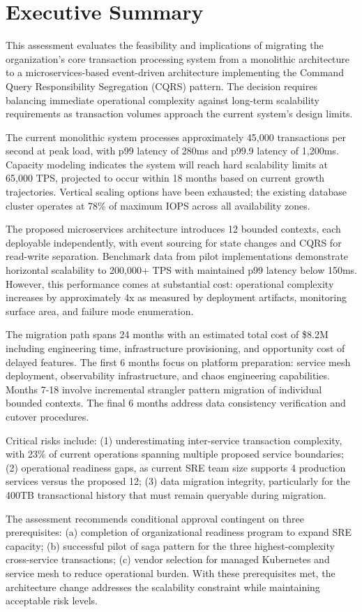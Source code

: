 \section{Executive Summary}

This assessment evaluates the feasibility and implications of migrating the organization's core transaction processing system from a monolithic architecture to a microservices-based event-driven architecture implementing the Command Query Responsibility Segregation (CQRS) pattern. The decision requires balancing immediate operational complexity against long-term scalability requirements as transaction volumes approach the current system's design limits.

The current monolithic system processes approximately 45,000 transactions per second at peak load, with p99 latency of 280ms and p99.9 latency of 1,200ms. Capacity modeling indicates the system will reach hard scalability limits at 65,000 TPS, projected to occur within 18 months based on current growth trajectories. Vertical scaling options have been exhausted; the existing database cluster operates at 78\% of maximum IOPS across all availability zones.

The proposed microservices architecture introduces 12 bounded contexts, each deployable independently, with event sourcing for state changes and CQRS for read-write separation. Benchmark data from pilot implementations demonstrate horizontal scalability to 200,000+ TPS with maintained p99 latency below 150ms. However, this performance comes at substantial cost: operational complexity increases by approximately 4x as measured by deployment artifacts, monitoring surface area, and failure mode enumeration.

The migration path spans 24 months with an estimated total cost of \$8.2M including engineering time, infrastructure provisioning, and opportunity cost of delayed features. The first 6 months focus on platform preparation: service mesh deployment, observability infrastructure, and chaos engineering capabilities. Months 7-18 involve incremental strangler pattern migration of individual bounded contexts. The final 6 months address data consistency verification and cutover procedures.

Critical risks include: (1) underestimating inter-service transaction complexity, with 23\% of current operations spanning multiple proposed service boundaries; (2) operational readiness gaps, as current SRE team size supports 4 production services versus the proposed 12; (3) data migration integrity, particularly for the 400TB transactional history that must remain queryable during migration.

The assessment recommends conditional approval contingent on three prerequisites: (a) completion of organizational readiness program to expand SRE capacity; (b) successful pilot of saga pattern for the three highest-complexity cross-service transactions; (c) vendor selection for managed Kubernetes and service mesh to reduce operational burden. With these prerequisites met, the architecture change addresses the scalability constraint while maintaining acceptable risk levels.
